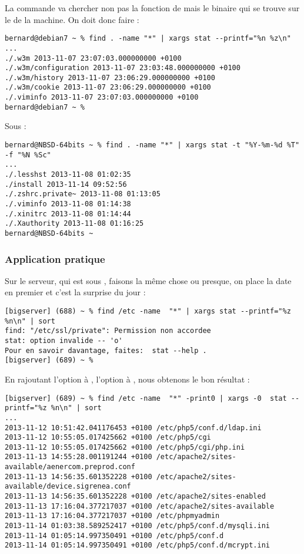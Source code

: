 La commande  va chercher non pas la fonction de \zsh{} mais le binaire qui se trouve sur le  de la machine. On doit donc faire :

\begin{lstlisting}[caption=stat tout rentre dans l'ordre sous Debian]
bernard@debian7 ~ % find . -name "*" | xargs stat --printf="%n %z\n"
...
./.w3m 2013-11-07 23:07:03.000000000 +0100
./.w3m/configuration 2013-11-07 23:03:48.000000000 +0100
./.w3m/history 2013-11-07 23:06:29.000000000 +0100
./.w3m/cookie 2013-11-07 23:06:29.000000000 +0100
./.viminfo 2013-11-07 23:07:03.000000000 +0100
bernard@debian7 ~ %
\end{lstlisting}

Sous \netbsd :

\begin{lstlisting}[caption=stat tout rentre dans l'ordre sous NetBSD]
bernard@NBSD-64bits ~ % find . -name "*" | xargs stat -t "%Y-%m-%d %T" -f "%N %Sc"
...
./.lesshst 2013-11-08 01:02:35
./install 2013-11-14 09:52:56
./.zshrc.private~ 2013-11-08 01:13:05
./.viminfo 2013-11-08 01:14:38
./.xinitrc 2013-11-08 01:14:44
./.Xauthority 2013-11-08 01:16:25
bernard@NBSD-64bits ~
\end{lstlisting}

\subsubsection{Application pratique}
Sur le serveur, qui est sous \linux, faisons la même chose ou presque, on place la date en premier et c'est la surprise du jour :

\begin{lstlisting}[caption=problèmes de droits sous Linux?]
[bigserver] (688) ~ % find /etc -name  "*" | xargs stat --printf="%z %n\n" | sort
find: "/etc/ssl/private": Permission non accordee
stat: option invalide -- 'o'
Pour en savoir davantage, faites:  stat --help .
[bigserver] (689) ~ %
\end{lstlisting}

En rajoutant l'option  à , l'option  à , nous obtenons le bon résultat :

\begin{lstlisting}[caption=problèmes résolus !]
[bigserver] (689) ~ % find /etc -name  "*" -print0 | xargs -0  stat --printf="%z %n\n" | sort
...
2013-11-12 10:51:42.041176453 +0100 /etc/php5/conf.d/ldap.ini
2013-11-12 10:55:05.017425662 +0100 /etc/php5/cgi
2013-11-12 10:55:05.017425662 +0100 /etc/php5/cgi/php.ini
2013-11-13 14:55:28.001191244 +0100 /etc/apache2/sites-available/aenercom.preprod.conf
2013-11-13 14:56:35.601352228 +0100 /etc/apache2/sites-available/device.sigrenea.conf
2013-11-13 14:56:35.601352228 +0100 /etc/apache2/sites-enabled
2013-11-13 17:16:04.377217037 +0100 /etc/apache2/sites-available
2013-11-13 17:16:04.377217037 +0100 /etc/phpmyadmin
2013-11-14 01:03:38.589252417 +0100 /etc/php5/conf.d/mysqli.ini
2013-11-14 01:05:14.997350491 +0100 /etc/php5/conf.d
2013-11-14 01:05:14.997350491 +0100 /etc/php5/conf.d/mcrypt.ini
\end{lstlisting}

